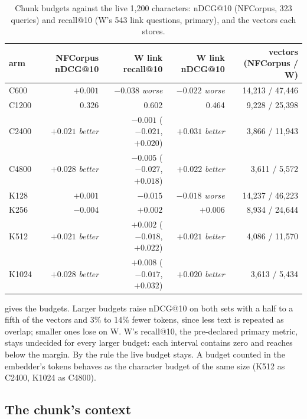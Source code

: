 \documentclass[11pt]{article}
\theoremstyle{plain}
\theoremstyle{definition}
\theoremstyle{remark}
\begin{document}
\begin{table}[t]
\centering\footnotesize
\caption{Chunk budgets against the live 1{,}200 characters: nDCG@10 (NFCorpus, 323 queries) and
recall@10 (W's 543 link questions, primary), and the vectors each stores.}\label{tab:chunks}
\setlength{\tabcolsep}{3.5pt}
\begin{tabular}{lrrrr}
\toprule
arm & NFCorpus nDCG@10 & W link recall@10 & W link nDCG@10 & vectors (NFCorpus / W) \\
\midrule
C600 & $+0.001$ & $-0.038$ \emph{worse} & $-0.022$ \emph{worse} & 14{,}213 / 47{,}446 \\
C1200 & 0.326 & 0.602 & 0.464 & 9{,}228 / 25{,}398 \\
C2400 & $+0.021$ \emph{better} & $-0.001$ ($-0.021$, $+0.020$) & $+0.031$ \emph{better} & 3{,}866 / 11{,}943 \\
C4800 & $+0.028$ \emph{better} & $-0.005$ ($-0.027$, $+0.018$) & $+0.022$ \emph{better} & 3{,}611 / 5{,}572 \\
K128 & $+0.001$ & $-0.015$ & $-0.018$ \emph{worse} & 14{,}237 / 46{,}223 \\
K256 & $-0.004$ & $+0.002$ & $+0.006$ & 8{,}934 / 24{,}644 \\
K512 & $+0.021$ \emph{better} & $+0.002$ ($-0.018$, $+0.022$) & $+0.021$ \emph{better} & 4{,}086 / 11{,}570 \\
K1024 & $+0.028$ \emph{better} & $+0.008$ ($-0.017$, $+0.032$) & $+0.020$ \emph{better} & 3{,}613 / 5{,}434 \\
\bottomrule
\end{tabular}
\end{table}

 gives the budgets. Larger budgets raise nDCG@10 on both sets with a half to a
fifth of the vectors and 3\% to 14\% fewer tokens, since less text is repeated as overlap; smaller
ones lose on W. W's recall@10, the pre-declared primary metric, stays undecided for every larger
budget: each interval contains zero and reaches below the margin. By the rule the live budget
stays. A budget counted in the embedder's tokens behaves as the character budget of the same size
(K512 as C2400, K1024 as C4800).

\subsection{The chunk's context}
\end{document}
